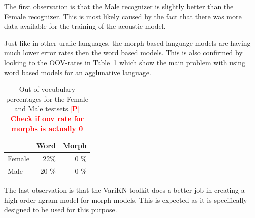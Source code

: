 \documentclass[b5paper]{article}
\newcommand{\todo}[2]{{\textcolor{red}{\bf [#1] #2 }}}
\begin{document}
The first observation is that the Male recognizer is slightly better than the Female recognizer. This is most likely caused by the fact that there was more data available for the training of the acoustic model.

Just like in other uralic languages, the morph based language models are having much lower error rates then the word based models. This is also confirmed by looking to the OOV-rates in Table~\ref{tbl:samioov} which show the main problem with using word based models for an agglunative language.

\begin{table}[!h]
\centering
\begin{tabular}{lrr}
& Word & Morph\\\hline
Female &  22\% & 0 \% \\
Male & 20 \% & 0 \%\\
\end{tabular}
\caption{Out-of-vocubulary percentages for the Female and Male testsets.\todo{P}{Check if oov rate for morphs is actually 0} \label{tbl:samioov}}
\end{table}

The last observation is that the VariKN toolkit does a better job in creating a high-order ngram model for morph models. This is expected as it is specifically designed to be used for this purpose.
\end{document}
